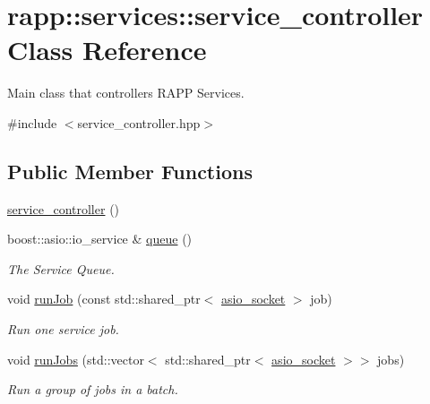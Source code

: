 \hypertarget{classrapp_1_1services_1_1service__controller}{\section{rapp\-:\-:services\-:\-:service\-\_\-controller Class Reference}
\label{classrapp_1_1services_1_1service__controller}
}


Main class that controllers R\-A\-P\-P Services.  




{\ttfamily \#include $<$service\-\_\-controller.\-hpp$>$}

\subsection*{Public Member Functions}
\begin{DoxyCompactItemize}
\item 
\hyperlink{classrapp_1_1services_1_1service__controller_a415c0e1572347e62a222cfbcfebaa882}{service\-\_\-controller} ()
\item 
boost\-::asio\-::io\-\_\-service \& \hyperlink{classrapp_1_1services_1_1service__controller_a200b57341d45404f38c3d5879dbaae9a}{queue} ()
\begin{DoxyCompactList}\small\item\em The Service Queue. \end{DoxyCompactList}\item 
void \hyperlink{classrapp_1_1services_1_1service__controller_a9a3617c5d622c8571a0306a6cc451fdb}{run\-Job} (const std\-::shared\-\_\-ptr$<$ \hyperlink{classrapp_1_1services_1_1asio__socket}{asio\-\_\-socket} $>$ job)
\begin{DoxyCompactList}\small\item\em Run one service job. \end{DoxyCompactList}\item 
void \hyperlink{classrapp_1_1services_1_1service__controller_a306a21f43ecad411f459227cf4500fb2}{run\-Jobs} (std\-::vector$<$ std\-::shared\-\_\-ptr$<$ \hyperlink{classrapp_1_1services_1_1asio__socket}{asio\-\_\-socket} $>$$>$ jobs)
\begin{DoxyCompactList}\small\item\em Run a group of jobs in a batch. \end{DoxyCompactList}\end{DoxyCompactItemize}
